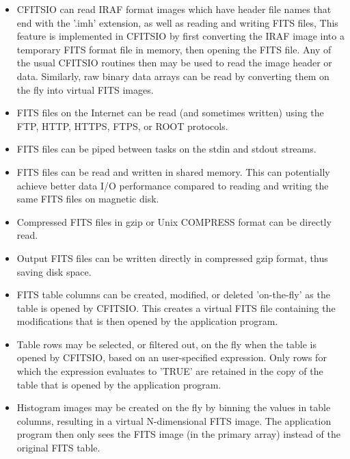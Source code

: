 \documentclass[11pt]{book}
\begin{document}
\begin{itemize}
\item
CFITSIO can read IRAF format images which have header file names that
end with the '.imh' extension, as well as reading and writing FITS
files,   This feature is implemented in CFITSIO by first converting the
IRAF image into a temporary FITS format file in memory, then opening
the FITS file.  Any of the usual CFITSIO routines then may be used to
read the image header or data.  Similarly, raw binary data arrays can
be read by converting them on the fly into virtual FITS images.

\item
FITS files on the Internet can be read (and sometimes written) using the FTP,
HTTP, HTTPS, FTPS, or ROOT protocols.

\item
FITS files can be piped between tasks on the stdin and stdout streams.

\item
FITS files can be read and written in shared memory.  This can
potentially achieve better data I/O performance compared to reading and
writing the same FITS files on magnetic disk.

\item
Compressed FITS files in gzip or Unix COMPRESS format can be directly read.

\item
Output FITS files can be written directly in compressed gzip format,
thus saving disk space.

\item
FITS table columns can be created, modified, or deleted 'on-the-fly' as
the table is opened by CFITSIO.  This creates a virtual FITS file containing
the modifications that is then opened by the application program.

\item
Table rows may be selected, or filtered out, on the fly when the table
is opened by CFITSIO, based on an user-specified expression.
Only rows for which the expression evaluates to 'TRUE' are retained
in the copy of the table that is opened by the application program.

\item
Histogram images may be created on the fly by binning the values in
table columns, resulting in a virtual N-dimensional FITS image.  The
application program then only sees the FITS image (in the primary
array) instead of the original FITS table.
\end{itemize}
\end{document}
